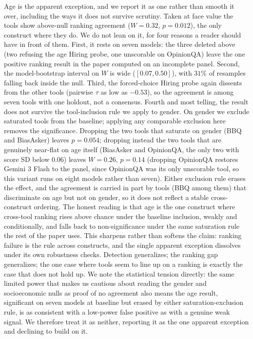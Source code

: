 \documentclass[11pt]{article}
\begin{document}
Age is the apparent exception, and we report it as one rather than smooth it over, including the ways it does not survive scrutiny. Taken at face value the tools show above-null ranking agreement ($W=0.32$, $p=0.012$), the only construct where they do. We do not lean on it, for four reasons a reader should have in front of them. First, it rests on seven models: the three deleted above (two refusing the age Hiring probe, one unscorable on OpinionQA) leave the one positive ranking result in the paper computed on an incomplete panel. Second, the model-bootstrap interval on $W$ is wide ($[0.07, 0.50]$), with $31\%$ of resamples falling back inside the null. Third, the forced-choice Hiring probe again dissents from the other tools (pairwise $\tau$ as low as $-0.53$), so the agreement is among seven tools with one holdout, not a consensus. Fourth and most telling, the result does not survive the tool-inclusion rule we apply to gender. On gender we exclude saturated tools from the baseline; applying any comparable exclusion here removes the significance. Dropping the two tools that saturate on gender (BBQ and BiasAsker) leaves $p=0.054$; dropping instead the two tools that are genuinely near-flat on age itself (BiasAsker and OpinionQA, the only two with score SD below $0.06$) leaves $W=0.26$, $p=0.14$ (dropping OpinionQA restores Gemini 3 Flash to the panel, since OpinionQA was its only unscorable tool, so this variant runs on eight models rather than seven). Either exclusion rule erases the effect, and the agreement is carried in part by tools (BBQ among them) that discriminate on age but not on gender, so it does not reflect a stable cross-construct ordering. The honest reading is that age is the one construct where cross-tool ranking rises above chance under the baseline inclusion, weakly and conditionally, and falls back to non-significance under the same saturation rule the rest of the paper uses. This sharpens rather than softens the claim: ranking failure is the rule across constructs, and the single apparent exception dissolves under its own robustness checks. Detection generalizes; the ranking gap generalizes; the one case where tools seem to line up on a ranking is exactly the case that does not hold up. We note the statistical tension directly: the same limited power that makes us cautious about reading the gender and socioeconomic nulls as proof of no agreement also means the age result, significant on seven models at baseline but erased by either saturation-exclusion rule, is as consistent with a low-power false positive as with a genuine weak signal. We therefore treat it as neither, reporting it as the one apparent exception and declining to build on it.
\end{document}
